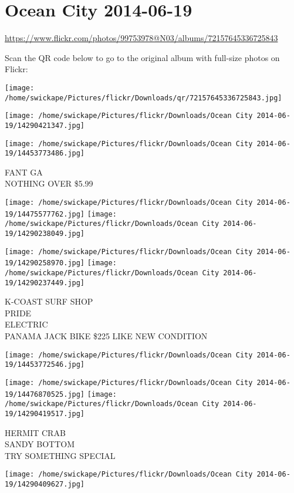 \documentclass[10pt,letterpaper]{article}
\title{}
\author{}
\date{}
\begin{document}
\section*{Ocean City 2014-06-19}

\url{https://www.flickr.com/photos/99753978@N03/albums/72157645336725843}

Scan the QR code below to go to the original album with full-size photos on Flickr:

\texttt{[image: /home/swickape/Pictures/flickr/Downloads/qr/72157645336725843.jpg]}
\pagebreak

\texttt{[image: /home/swickape/Pictures/flickr/Downloads/Ocean City 2014-06-19/14290421347.jpg]}

\vspace{0.25in}
\texttt{[image: /home/swickape/Pictures/flickr/Downloads/Ocean City 2014-06-19/14453773486.jpg]}

FANT GA\\
NOTHING OVER \$5.99
\pagebreak

\texttt{[image: /home/swickape/Pictures/flickr/Downloads/Ocean City 2014-06-19/14475577762.jpg]}
\texttt{[image: /home/swickape/Pictures/flickr/Downloads/Ocean City 2014-06-19/14290238049.jpg]}

\texttt{[image: /home/swickape/Pictures/flickr/Downloads/Ocean City 2014-06-19/14290258970.jpg]}
\texttt{[image: /home/swickape/Pictures/flickr/Downloads/Ocean City 2014-06-19/14290237449.jpg]}

K{-}COAST SURF SHOP\\
PRIDE\\
ELECTRIC\\
PANAMA JACK BIKE \$225 LIKE NEW CONDITION
\pagebreak

\texttt{[image: /home/swickape/Pictures/flickr/Downloads/Ocean City 2014-06-19/14453772546.jpg]}

\vspace{0.25in}
\texttt{[image: /home/swickape/Pictures/flickr/Downloads/Ocean City 2014-06-19/14476870525.jpg]}
\texttt{[image: /home/swickape/Pictures/flickr/Downloads/Ocean City 2014-06-19/14290419517.jpg]}

HERMIT CRAB\\
SANDY BOTTOM\\
TRY SOMETHING SPECIAL
\pagebreak

\texttt{[image: /home/swickape/Pictures/flickr/Downloads/Ocean City 2014-06-19/14290409627.jpg]}
\end{document}
